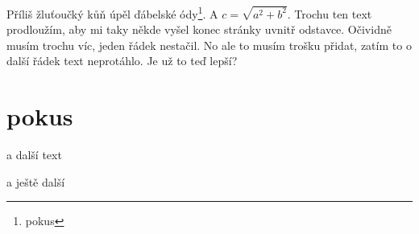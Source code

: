 \documentclass{article}
\begin{document}
Příliš žluťoučký kůň úpěl ďábelské ódy\footnote{pokus}. A $c=\sqrt{a^2+b^2}$. Trochu ten text prodloužím, aby mi taky někde vyšel konec stránky uvnitř odstavce. Očividně musím trochu víc, jeden řádek nestačil. No ale to musím trošku přidat, zatím to o další řádek text neprotáhlo. Je už to teď lepší? 

\section{pokus}

a další text

a ještě další
\end{document}
